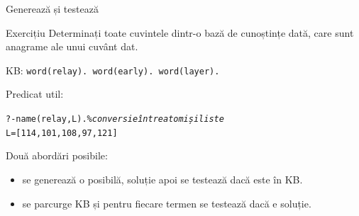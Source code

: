 \documentclass[xcolor=x11names,compress,10pt]{beamer}
\begin{document}
\begin{frame}{Generează și testează}
\vspace*{0.3cm}

\begin{center}
\end{center}

\begin{block}{Exercițiu}
Determinați toate cuvintele dintr-o bază de 
cunoștințe dată, care sunt anagrame ale unui cuvânt dat.

\medskip

KB: \texttt{word(relay). word(early). word(layer).}
\medskip

Predicat util:\\
\begin{alltt}
?- name(relay,L). \% {\em conversie între atomi și liste}\\
L = [114, 101, 108, 97, 121]
\end{alltt}
\end{block}
\pause
Două abordări posibile:
\begin{itemize}
\item  se generează o posibilă, soluție apoi se testează dacă este în KB.
\item se parcurge KB și pentru fiecare termen se testează dacă e soluție. 
\end{itemize}
\end{frame}
\end{document}
